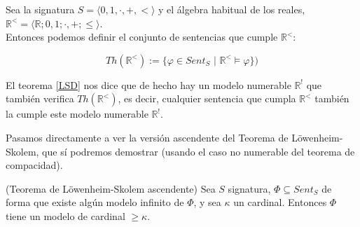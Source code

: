 \begin{example}
Sea la signatura $S=\langle0,1,\cdot,+,<\rangle$ y el álgebra habitual de los reales, $\mathbb{R}^<=\langle\mathbb{R};0,1;\cdot,+;\leq\rangle$.\\

Entonces podemos definir el conjunto de sentencias que cumple $\mathbb{R}^<$:

\[Th(\mathbb{R}^<) :=\{\varphi\in Sent_S\, \, | \, \, \mathbb{R}^<\vDash\varphi\})\]

El teorema \ref{LSD} nos dice que de hecho hay un modelo numerable $\mathbb{R}^!$ que también verifica $Th(\mathbb{R}^<)$, es decir, cualquier sentencia que cumpla $\mathbb{R}^<$ también la cumple este modelo numerable $\mathbb{R}^!$.
\end{example}

Pasamos directamente a ver la versión ascendente del Teorema de Löwenheim-Skolem, que sí podremos demostrar (usando el caso no numerable del teorema de compacidad).

\begin{theorem}(Teorema de Löwenheim-Skolem ascendente)
Sea $S$ signatura, $\Phi\subseteq Sent_S$ de forma que existe algún modelo infinito de $\Phi$, y sea $\kappa$ un cardinal. Entonces $\Phi$ tiene un modelo de cardinal $\geq\kappa$.
\end{theorem}

